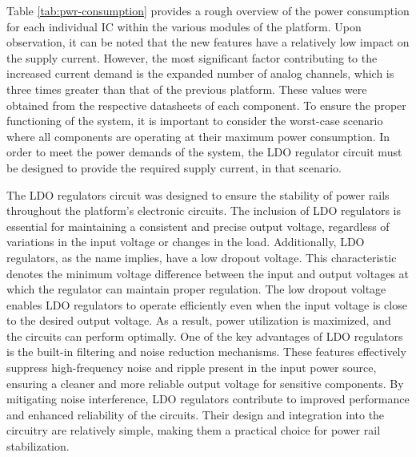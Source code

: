 Table \ref{tab:pwr-consumption} provides a rough overview of the power consumption for each individual \ac{IC} within the various modules of the platform. Upon observation, it can be noted that the new features have a relatively low impact on the supply current. However, the most significant factor contributing to the increased current demand is the expanded number of analog channels, which is three times greater than that of the previous platform. These values were obtained from the respective datasheets of each component. To ensure the proper functioning of the system, it is important to consider the worst-case scenario where all components are operating at their maximum power consumption. In order to meet the power demands of the system, the \ac{LDO} regulator circuit must be designed to provide the required supply current, in that scenario.


\noindent
The \ac{LDO} regulators circuit was designed to ensure the stability of power rails throughout the platform's electronic circuits. The inclusion of \ac{LDO} regulators is essential for maintaining a consistent and precise output voltage, regardless of variations in the input voltage or changes in the load. Additionally, \ac{LDO} regulators, as the name implies, have a low dropout voltage. This characteristic denotes the minimum voltage difference between the input and output voltages at which the regulator can maintain proper regulation. The low dropout voltage enables \ac{LDO} regulators to operate efficiently even when the input voltage is close to the desired output voltage. As a result, power utilization is maximized, and the circuits can perform optimally. One of the key advantages of \ac{LDO} regulators is the built-in filtering and noise reduction mechanisms. These features effectively suppress high-frequency noise and ripple present in the input power source, ensuring a cleaner and more reliable output voltage for sensitive components. By mitigating noise interference, \ac{LDO} regulators contribute to improved performance and enhanced reliability of the circuits. Their design and integration into the circuitry are relatively simple, making them a practical choice for power rail stabilization.

